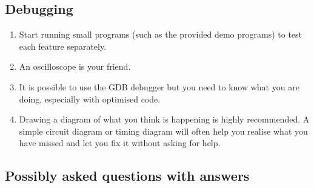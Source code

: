 \documentclass[11pt, a4paper]{article}
\begin{document}
\subsection{Debugging}

\begin{enumerate}
\item Start running small programs (such as the provided demo
  programs) to test each feature separately.
  
\item An oscilloscope is your friend.

\item It is possible to use the GDB debugger but you need to know what
  you are doing, especially with optimised code.

\item Drawing a diagram of what you think is happening is highly recommended. A
simple circuit diagram or timing diagram will often help you realise what you
have missed and let you fix it without asking for help.
  
\end{enumerate}


\subsection{Possibly asked questions with answers}
\end{document}
